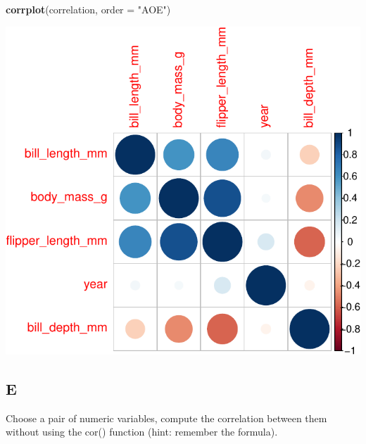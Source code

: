 \documentclass[
]{article}
\newenvironment{Shaded}{\begin{snugshade}}{\end{snugshade}}
\newcommand{\DataTypeTok}[1]{\textcolor[rgb]{0.13,0.29,0.53}{#1}}
\newcommand{\KeywordTok}[1]{\textcolor[rgb]{0.13,0.29,0.53}{\textbf{#1}}}
\newcommand{\NormalTok}[1]{#1}
\newcommand{\StringTok}[1]{\textcolor[rgb]{0.31,0.60,0.02}{#1}}
\begin{document}
\begin{Shaded}
\begin{Highlighting}[]
\KeywordTok{corrplot}\NormalTok{(correlation, }\DataTypeTok{order =} \StringTok{"AOE"}\NormalTok{)}
\end{Highlighting}
\end{Shaded}

\includegraphics{es_files/figure-latex/unnamed-chunk-23-1.pdf}

\hypertarget{e-2}{%
\subsection{E}\label{e-2}}

Choose a pair of numeric variables, compute the correlation between them
without using the cor() function (hint: remember the formula).
\end{document}
